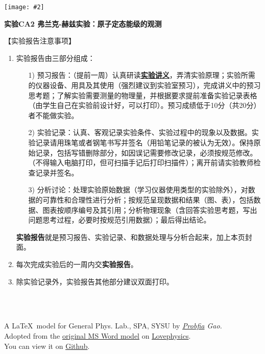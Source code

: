 \documentclass[11pt,a4paper]{ctexart}
\newcommand{\ExpeName}{实验CA2 弗兰克-赫兹实验：原子定态能级的观测}
\newcommand{\cpic}[2]{
\begin{center}
\texttt{[image: \#2]}
\end{center}
}
\begin{document}
\cpic{0.255}{e1}%
\begin{center}
\LARGE\textbf{{\ExpeName}}
\end{center}
\large{【实验报告注意事项】}
\begin{enumerate}
 \item 实验报告由三部分组成：
 \begin{enumerate}
  \item[1)]预习报告：（提前一周）认真研读\textbf{\uline{实验讲义}}，弄清实验原理；实验所需的仪器设备、用具及其使用（强烈建议到实验室预习），完成讲义中的预习思考题；了解实验需要测量的物理量，并根据要求提前准备实验记录表格（由学生自己在实验前设计好，可以打印）。预习成绩低于10分（共20分）者不能做实验。
  \item[2)]实验记录：认真、客观记录实验条件、实验过程中的现象以及数据。实验记录请用珠笔或者钢笔书写并签名（{\color{red}用铅笔记录的被认为无效}）。{\color{red}保持原始记录，包括写错删除部分，如因误记需要修改记录，必须按规范修改。}（不得输入电脑打印，但可扫描手记后打印扫描件）；离开前请实验教师检查记录并签名。
  \item[3)]分析讨论：处理实验原始数据（学习仪器使用类型的实验除外），对数据的可靠性和合理性进行分析；按规范呈现数据和结果（图、表），包括数据、图表按顺序编号及其引用；分析物理现象（含回答实验思考题，写出问题思考过程，必要时按规范引用数据）；最后得出结论。
 \end{enumerate}
 \textbf{实验报告}就是预习报告、实验记录、和数据处理与分析合起来，加上本页封面。
 \item 每次完成实验后的一周内交\textbf{实验报告}。
 \item 除实验记录外，实验报告其他部分建议双面打印。
\end{enumerate}
\ 
\\
\ 

\begin{flushright}                                                           %
\tiny{
A \LaTeX \ model for General Phys. Lab., SPA, SYSU by {\em \href{https://www.weibo.com/3532532974/profile?rightmod=1&wvr=6&mod=personinfo&is_all=1}{Probfia} Gao.}\\ Adopted from the \href{http://lovephysics.sysu.edu.cn/lib/exe/fetch.php?media=courses:secondlevelzhuhai:report.docx}{original MS Word model} on \href{http://lovephysics.sysu.edu.cn}{Lovephysics}.\\ You can view it on \href{https://github.com/Probfia/SYSU_GPL_C}{Github}.}
\end{flushright}
\end{document}

